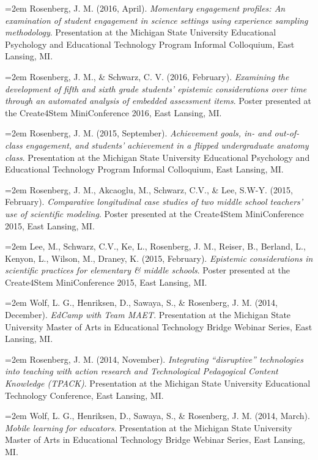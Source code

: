 \documentclass[
  14,
]{article}
\begin{document}
\hangindent=2em Rosenberg, J. M. (2016, April). \emph{Momentary
engagement profiles: An examination of student engagement in science
settings using experience sampling methodology}. Presentation at the
Michigan State University Educational Psychology and Educational
Technology Program Informal Colloquium, East Lansing, MI.

\hangindent=2em Rosenberg, J. M., \& Schwarz, C. V. (2016, February).
\emph{Examining the development of fifth and sixth grade students'
epistemic considerations over time through an automated analysis of
embedded assessment items}. Poster presented at the Create4Stem
MiniConference 2016, East Lansing, MI.

\hangindent=2em Rosenberg, J. M. (2015, September). \emph{Achievement
goals, in- and out-of-class engagement, and students' achievement in a
flipped undergraduate anatomy class}. Presentation at the Michigan State
University Educational Psychology and Educational Technology Program
Informal Colloquium, East Lansing, MI.

\hangindent=2em Rosenberg, J. M., Akcaoglu, M., Schwarz, C.V., \& Lee,
S.W-Y. (2015, February). \emph{Comparative longitudinal case studies of
two middle school teachers' use of scientific modeling}. Poster
presented at the Create4Stem MiniConference 2015, East Lansing, MI.

\hangindent=2em Lee, M., Schwarz, C.V., Ke, L., Rosenberg, J. M.,
Reiser, B., Berland, L., Kenyon, L., Wilson, M., Draney, K. (2015,
February). \emph{Epistemic considerations in scientific practices for
elementary \& middle schools}. Poster presented at the Create4Stem
MiniConference 2015, East Lansing, MI.

\hangindent=2em Wolf, L. G., Henriksen, D., Sawaya, S., \& Rosenberg, J.
M. (2014, December). \emph{EdCamp with Team MAET}. Presentation at the
Michigan State University Master of Arts in Educational Technology
Bridge Webinar Series, East Lansing, MI.

\hangindent=2em Rosenberg, J. M. (2014, November). \emph{Integrating
``disruptive'' technologies into teaching with action research and
Technological Pedagogical Content Knowledge (TPACK)}. Presentation at
the Michigan State University Educational Technology Conference, East
Lansing, MI.

\hangindent=2em Wolf, L. G., Henriksen, D., Sawaya, S., \& Rosenberg, J.
M. (2014, March). \emph{Mobile learning for educators}. Presentation at
the Michigan State University Master of Arts in Educational Technology
Bridge Webinar Series, East Lansing, MI.
\end{document}
